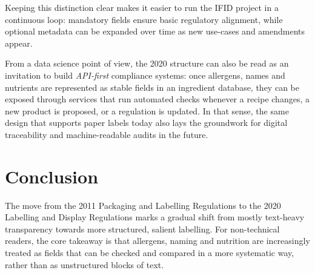 \documentclass[12pt,a4paper]{article}
\begin{document}
Keeping this distinction clear makes it easier to run the IFID project in a continuous loop: mandatory fields ensure basic regulatory alignment, while optional metadata can be expanded over time as new use-cases and amendments appear.

From a data science point of view, the 2020 structure can also be read as an invitation to build \emph{API-first} compliance systems: once allergens, names and nutrients are represented as stable fields in an ingredient database, they can be exposed through services that run automated checks whenever a recipe changes, a new product is proposed, or a regulation is updated.
In that sense, the same design that supports paper labels today also lays the groundwork for digital traceability and machine-readable audits in the future.

\section{Conclusion}

The move from the 2011 Packaging and Labelling Regulations to the 2020 Labelling and Display Regulations marks a gradual shift from mostly text-heavy transparency towards more structured, salient labelling.
For non-technical readers, the core takeaway is that allergens, naming and nutrition are increasingly treated as fields that can be checked and compared in a more systematic way, rather than as unstructured blocks of text.
\end{document}
